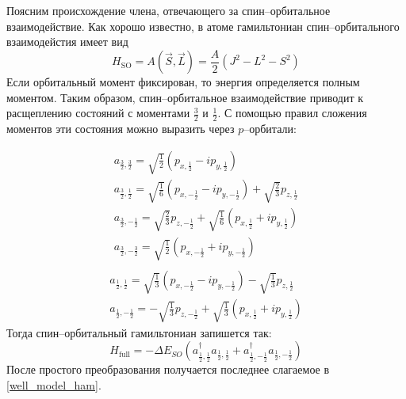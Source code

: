 Поясним происхождение члена, отвечающего за спин--орбитальное взаимодействие.
Как хорошо известно, в атоме гамильтониан спин--орбитального взаимодейстия имеет вид
\begin{equation}
    H_{\mathrm{SO}} =  A(\vec{S}, \vec{L}) = \frac{A}{2}(J^2 - L^2 - S^2)
\end{equation}
Если орбитальный момент фиксирован, то энергия определяется полным моментом. Таким образом,
спин--орбитальное взаимодействие приводит к расщеплению состояний с моментами $\frac32$ и
$\frac12$. С помощью правил сложения моментов эти состояния можно выразить через 
$p$--орбитали: 

\begin{equation}
	\label{transform1}
	\begin{gathered}
		a_{\frac{3}{2}, \frac{3}{2}} = 
			\sqrt{\frac{1}{2}} \left(p_{x,\frac{1}{2}} - i p_{y,\frac{1}{2}}\right)\\
		a_{\frac{3}{2}, \frac{1}{2}} = 
			\sqrt{\frac{1}{6}} \left(p_{x,-\frac{1}{2}} - i p_{y,-\frac{1}{2}}\right) 
				+ \sqrt{\frac{2}{3}} p_{z, \frac{1}{2}}\\
		a_{\frac{3}{2}, -\frac{1}{2}} = 
			\sqrt{\frac{2}{3}} p_{z, -\frac{1}{2}}+
				\sqrt{\frac{1}{6}} \left(p_{x,\frac{1}{2}} + i p_{y,\frac{1}{2}}\right) \\
		a_{\frac{3}{2}, -\frac{3}{2}} = 
			\sqrt{\frac{1}{2}} \left(p_{x,-\frac{1}{2}} + i p_{y,-\frac{1}{2}}\right)\\
	\end{gathered}
\end{equation}
\begin{equation}
	\label{transform2}
	\begin{gathered}
		a_{\frac{1}{2}, \frac{1}{2}} = 
			\sqrt{\frac{1}{3}}\left(p_{x, -\frac{1}{2}} - ip_{y,-\frac{1}{2}}\right) - 
				\sqrt{\frac{1}{3}} p_{z,\frac{1}{2}}\\
		a_{\frac{1}{2}, -\frac{1}{2}} = 
			-\sqrt{\frac{1}{3}} p_{z,-\frac{1}{2}} + 
				\sqrt{\frac{1}{3}}\left(p_{x, \frac{1}{2}} + ip_{y,\frac{1}{2}}\right)
	\end{gathered}
\end{equation}
Тогда спин--орбитальный гамильтониан запишется так:
\begin{equation}
	H_{\mathrm{full}} = -\Delta E_{SO} 
			(a_{\frac{1}{2}, \frac{1}{2}}^\dagger a_{\frac{1}{2}, \frac{1}{2}} +
			a_{\frac{1}{2}, -\frac{1}{2}}^\dagger a_{\frac{1}{2}, -\frac{1}{2}})
\end{equation}
После простого преобразования получается последнее слагаемое в \eqref{well_model_ham}.
